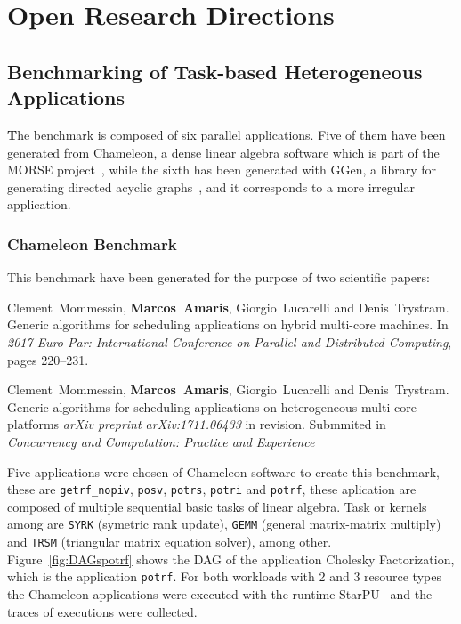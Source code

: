 \chapter{Open Research Directions} \label{Chap:Bench}




\section{Benchmarking of Task-based Heterogeneous Applications}

\lettrine[findent=2pt]{\textbf{T}}{}he benchmark is composed of six parallel applications. Five of them have been generated from Chameleon, a dense linear algebra software which is part of the MORSE project~\cite{agullo2012morse}, while the sixth has been generated with GGen, a library for generating directed acyclic graphs~\cite{GGen:simutools10}, and it corresponds to a more irregular application.


\subsection{Chameleon Benchmark}
This benchmark have been generated for the purpose of two scientific papers:
\begin{itemize}
Clement~Mommessin, {\bf Marcos~Amaris}, Giorgio~Lucarelli and Denis~Trystram.
\newblock Generic algorithms for scheduling applications on hybrid multi-core
  machines.
\newblock In \emph{2017 Euro-Par: International Conference on Parallel and
  Distributed Computing}, pages 220--231. 
  
Clement~Mommessin, {\bf Marcos~Amaris}, Giorgio~Lucarelli and Denis~Trystram.
\newblock Generic algorithms for scheduling applications on heterogeneous multi-core platforms
\newblock \emph{arXiv preprint arXiv:1711.06433} in revision. Submmited in 
\emph{Concurrency and Computation: Practice and Experience}
\end{itemize} 

Five applications were chosen of Chameleon software to create this benchmark, these are  \texttt{getrf\_nopiv}, \texttt{posv}, \texttt{potrs}, \texttt{potri} and \texttt{potrf}, these aplication are composed of multiple sequential basic tasks of linear algebra. Task or kernels among are \texttt{SYRK} (symetric rank update), \texttt{GEMM} (general matrix-matrix multiply) and \texttt{TRSM} (triangular matrix equation solver), among other. Figure~\ref{fig:DAGspotrf} shows the DAG of the application Cholesky Factorization, which is the application \texttt{potrf}. For both workloads with 2 and 3 resource types the Chameleon applications were executed with the runtime StarPU~\citep{agullo2012morse} and the traces of executions were collected. 

